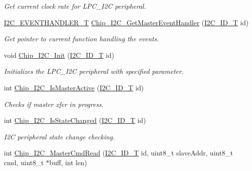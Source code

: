 \begin{DoxyCompactItemize}
\begin{DoxyCompactList}\small\item\em Get current clock rate for L\+P\+C\+\_\+\+I2C peripheral. \end{DoxyCompactList}\item 
\hyperlink{group__I2C__17XX__40XX_gaef152f4dc1487d90573810007489082e}{I2\+C\+\_\+\+E\+V\+E\+N\+T\+H\+A\+N\+D\+L\+E\+R\+\_\+T} \hyperlink{group__I2C__17XX__40XX_gafad03b4f6c0ecb3f59f014ab63bfda5c}{Chip\+\_\+\+I2\+C\+\_\+\+Get\+Master\+Event\+Handler} (\hyperlink{group__I2C__17XX__40XX_ga957556a4d900506cd4cba8427afd81e6}{I2\+C\+\_\+\+I\+D\+\_\+T} id)
\begin{DoxyCompactList}\small\item\em Get pointer to current function handling the events. \end{DoxyCompactList}\item 
void \hyperlink{group__I2C__17XX__40XX_gab79263d278814945df2cd44c5db7b514}{Chip\+\_\+\+I2\+C\+\_\+\+Init} (\hyperlink{group__I2C__17XX__40XX_ga957556a4d900506cd4cba8427afd81e6}{I2\+C\+\_\+\+I\+D\+\_\+T} id)
\begin{DoxyCompactList}\small\item\em Initializes the L\+P\+C\+\_\+\+I2C peripheral with specified parameter. \end{DoxyCompactList}\item 
int \hyperlink{group__I2C__17XX__40XX_ga5fdf29aff7847c93373cf02da41285e1}{Chip\+\_\+\+I2\+C\+\_\+\+Is\+Master\+Active} (\hyperlink{group__I2C__17XX__40XX_ga957556a4d900506cd4cba8427afd81e6}{I2\+C\+\_\+\+I\+D\+\_\+T} id)
\begin{DoxyCompactList}\small\item\em Checks if master xfer in progress. \end{DoxyCompactList}\item 
int \hyperlink{group__I2C__17XX__40XX_ga4240d03d5dda43ddc8afd527b3172318}{Chip\+\_\+\+I2\+C\+\_\+\+Is\+State\+Changed} (\hyperlink{group__I2C__17XX__40XX_ga957556a4d900506cd4cba8427afd81e6}{I2\+C\+\_\+\+I\+D\+\_\+T} id)
\begin{DoxyCompactList}\small\item\em I2C peripheral state change checking. \end{DoxyCompactList}\item 
int \hyperlink{group__I2C__17XX__40XX_ga4a875b456dfe68acbe8ce1fc74d88bd3}{Chip\+\_\+\+I2\+C\+\_\+\+Master\+Cmd\+Read} (\hyperlink{group__I2C__17XX__40XX_ga957556a4d900506cd4cba8427afd81e6}{I2\+C\+\_\+\+I\+D\+\_\+T} id, uint8\+\_\+t slave\+Addr, uint8\+\_\+t cmd, uint8\+\_\+t $\ast$buff, int len)

\end{DoxyCompactItemize}
